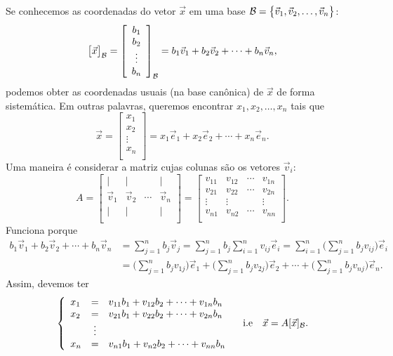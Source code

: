 \documentclass[../livro.tex]{subfiles}  %
\begin{document}
Se conhecemos as coordenadas do vetor $\vec{x}$ em uma base $\mathcal{B} = \big\{ \vec{v}_1, \vec{v}_2, \dots, \vec{v}_n \big\}$:
\[
\big[ \vec{x} \big]_{\mathcal{B}} =
\left[
\begin{array}{c}
b_1 \\
b_2 \\
\vdots \\
b_n \\
\end{array}
\right]_{\mathcal{B}} = b_1 \vec{v}_1 + b_2 \vec{v}_2 + \cdots + b_n \vec{v}_n,
\] podemos obter as coordenadas usuais (na base canônica) de $\vec{x}$ de forma sistemática. Em outras palavras, queremos encontrar $x_1, x_2, \dots, x_n$ tais que 
\[
\vec{x} = \left[
\begin{array}{c}
x_1 \\
x_2 \\
\vdots \\
x_n \\
\end{array}
\right] = x_1 \vec{e}_1 + x_2 \vec{e}_2 + \cdots + x_n \vec{e}_n.
\] Uma maneira é considerar a matriz cujas colunas são os vetores $\vec{v}_i$:
\[
A =
\left[
\begin{array}{cccc}
| & | &  & | \\
\vec{v}_{1} & \vec{v}_{2} & \cdots & \vec{v}_{n} \\
| & | &  & | \\
\end{array}
\right] = 
\left[
\begin{array}{cccc}
v_{11} & v_{12} & \cdots & v_{1n} \\
v_{21} & v_{22} & \cdots & v_{2n} \\
\vdots & \vdots &        & \vdots \\
v_{n1} & v_{n2} & \cdots & v_{nn} \\
\end{array}
\right].
\] Funciona porque 
\begin{align*}
b_1 \vec{v}_1 + b_2 \vec{v}_2 + \cdots + b_n \vec{v}_n & = \sum_{j=1}^{n} b_j \vec{v}_j = \sum_{j=1}^{n} b_j \sum_{i=1}^{n} v_{ij} \vec{e}_i  = \sum_{i=1}^{n} \bigg(\sum_{j=1}^{n} b_j v_{ij}\bigg) \vec{e}_i \\
& = \bigg(\sum_{j=1}^{n} b_j v_{1j}\bigg) \vec{e}_1 + \bigg(\sum_{j=1}^{n} b_j v_{2j}\bigg) \vec{e}_2 + \cdots + \bigg(\sum_{j=1}^{n} b_j v_{nj}\bigg) \vec{e}_n.
\end{align*}
Assim, devemos ter
\[
\left\{
\begin{array}{lcl}
x_1 &=& v_{11} b_{1} + v_{12} b_{2} + \cdots + v_{1n} b_{n} \\
x_2 &=& v_{21} b_{1} + v_{22} b_{2} + \cdots + v_{2n} b_{n} \\
&\vdots& \\
x_n &=& v_{n1} b_{1} + v_{n2} b_{2} + \cdots + v_{nn} b_{n} \\
\end{array}
\right. \quad \text{i.e} \quad \vec{x} = A [\vec{x}]_{\mathcal{B}}.
\]
\end{document}
